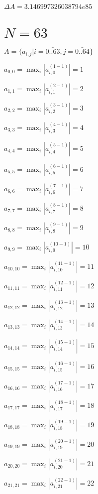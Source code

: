 \documentclass[a4paper,12pt]{article}
\begin{document}
$\Delta A = 3.146997326038794e85$



\section{ $N = 63$ }
$A = \{ a _{ i, j } | i = \bar { 0..63 }, j = \bar { 0..64 } \}$

$a _{ 0, 0 } =  \max _i |a _{ i, 0 } ^{ (1 - 1) } | = 1$

$a _{ 1, 1 } =  \max _i |a _{ i, 1 } ^{ (2 - 1) } | = 2$

$a _{ 2, 2 } =  \max _i |a _{ i, 2 } ^{ (3 - 1) } | = 3$

$a _{ 3, 3 } =  \max _i |a _{ i, 3 } ^{ (4 - 1) } | = 4$

$a _{ 4, 4 } =  \max _i |a _{ i, 4 } ^{ (5 - 1) } | = 5$

$a _{ 5, 5 } =  \max _i |a _{ i, 5 } ^{ (6 - 1) } | = 6$

$a _{ 6, 6 } =  \max _i |a _{ i, 6 } ^{ (7 - 1) } | = 7$

$a _{ 7, 7 } =  \max _i |a _{ i, 7 } ^{ (8 - 1) } | = 8$

$a _{ 8, 8 } =  \max _i |a _{ i, 8 } ^{ (9 - 1) } | = 9$

$a _{ 9, 9 } =  \max _i |a _{ i, 9 } ^{ (10 - 1) } | = 10$

$a _{ 10, 10 } =  \max _i |a _{ i, 10 } ^{ (11 - 1) } | = 11$

$a _{ 11, 11 } =  \max _i |a _{ i, 11 } ^{ (12 - 1) } | = 12$

$a _{ 12, 12 } =  \max _i |a _{ i, 12 } ^{ (13 - 1) } | = 13$

$a _{ 13, 13 } =  \max _i |a _{ i, 13 } ^{ (14 - 1) } | = 14$

$a _{ 14, 14 } =  \max _i |a _{ i, 14 } ^{ (15 - 1) } | = 15$

$a _{ 15, 15 } =  \max _i |a _{ i, 15 } ^{ (16 - 1) } | = 16$

$a _{ 16, 16 } =  \max _i |a _{ i, 16 } ^{ (17 - 1) } | = 17$

$a _{ 17, 17 } =  \max _i |a _{ i, 17 } ^{ (18 - 1) } | = 18$

$a _{ 18, 18 } =  \max _i |a _{ i, 18 } ^{ (19 - 1) } | = 19$

$a _{ 19, 19 } =  \max _i |a _{ i, 19 } ^{ (20 - 1) } | = 20$

$a _{ 20, 20 } =  \max _i |a _{ i, 20 } ^{ (21 - 1) } | = 21$

$a _{ 21, 21 } =  \max _i |a _{ i, 21 } ^{ (22 - 1) } | = 22$
\end{document}
